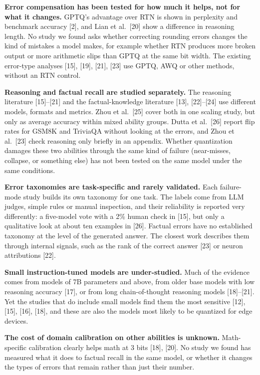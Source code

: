 \documentclass[10pt,twocolumn]{article}
\begin{document}
\textbf{Error compensation has been tested for how much it helps, not
for what it changes.} GPTQ's advantage over RTN is shown in perplexity
and benchmark accuracy [2], and Lian et al.~[20] show a difference in
reasoning length. No study we found asks whether correcting rounding
errors changes the kind of mistakes a model makes, for example whether
RTN produces more broken output or more arithmetic slips than GPTQ at
the same bit width. The existing error-type analyses [15], [19], [21],
[23] use GPTQ, AWQ or other methods, without an RTN control.

\textbf{Reasoning and factual recall are studied separately.} The
reasoning literature [15]--[21] and the factual-knowledge literature
[13], [22]--[24] use different models, formats and metrics. Zhou et
al.~[25] cover both in one scaling study, but only as average accuracy
within mixed ability groups. Dutta et al.~[26] report flip rates for
GSM8K and TriviaQA without looking at the errors, and Zhou et al.~[23]
check reasoning only briefly in an appendix. Whether quantization
damages these two abilities through the same kind of failure
(near-misses, collapse, or something else) has not been tested on the
same model under the same conditions.

\textbf{Error taxonomies are task-specific and rarely validated.} Each
failure-mode study builds its own taxonomy for one task. The labels come
from LLM judges, simple rules or manual inspection, and their
reliability is reported very differently: a five-model vote with a 2\%
human check in [15], but only a qualitative look at about ten examples
in [26]. Factual errors have no established taxonomy at the level of the
generated answer. The closest work describes them through internal
signals, such as the rank of the correct answer [23] or neuron
attributions [22].

\textbf{Small instruction-tuned models are under-studied.} Much of the
evidence comes from models of 7B parameters and above, from older base
models with low reasoning accuracy [17], or from long chain-of-thought
reasoning models [18]--[21]. Yet the studies that do include small
models find them the most sensitive [12], [15], [16], [18], and these
are also the models most likely to be quantized for edge devices.

\textbf{The cost of domain calibration on other abilities is unknown.}
Math-specific calibration clearly helps math at 3 bits [18], [20]. No
study we found has measured what it does to factual recall in the same
model, or whether it changes the types of errors that remain rather than
just their number.
\end{document}

